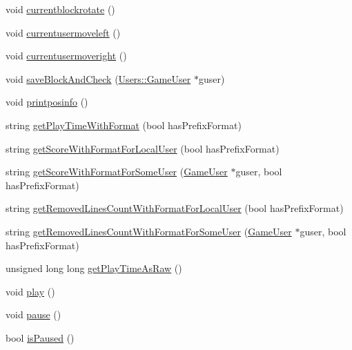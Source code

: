\begin{DoxyCompactItemize}
\item 
void \hyperlink{class_tetris_1_1_game_controller_a5d93facb945f87ba33fb8be74df023fa}{currentblockrotate} ()
\item 
void \hyperlink{class_tetris_1_1_game_controller_ac0d40a0936505754131099034b4271fa}{currentusermoveleft} ()
\item 
void \hyperlink{class_tetris_1_1_game_controller_a1d2859507cbc9bf9789753228cdedc1f}{currentusermoveright} ()
\item 
void \hyperlink{class_tetris_1_1_game_controller_a3c63a9754e4cbeae4f66a5760bb4055d}{save\+Block\+And\+Check} (\hyperlink{class_tetris_1_1_users_1_1_game_user}{Users\+::\+Game\+User} $\ast$guser)
\item 
void \hyperlink{class_tetris_1_1_game_controller_a269da7d33475ae2f327ee9a51f02ef52}{printposinfo} ()
\item 
string \hyperlink{class_tetris_1_1_game_controller_a71765a7d8b76400832c98002a113ed26}{get\+Play\+Time\+With\+Format} (bool has\+Prefix\+Format)
\item 
string \hyperlink{class_tetris_1_1_game_controller_a84270bd9c52aae8ba1434d96a96b6c3c}{get\+Score\+With\+Format\+For\+Local\+User} (bool has\+Prefix\+Format)
\item 
string \hyperlink{class_tetris_1_1_game_controller_ab9ee25a033698516dd98c254ab8f8f1b}{get\+Score\+With\+Format\+For\+Some\+User} (\hyperlink{class_tetris_1_1_users_1_1_game_user}{Game\+User} $\ast$guser, bool has\+Prefix\+Format)
\item 
string \hyperlink{class_tetris_1_1_game_controller_a9fdc5288a92d09283a6250d684d69876}{get\+Removed\+Lines\+Count\+With\+Format\+For\+Local\+User} (bool has\+Prefix\+Format)
\item 
string \hyperlink{class_tetris_1_1_game_controller_a2e7275bdb8f29ce4f1dfec790c22705d}{get\+Removed\+Lines\+Count\+With\+Format\+For\+Some\+User} (\hyperlink{class_tetris_1_1_users_1_1_game_user}{Game\+User} $\ast$guser, bool has\+Prefix\+Format)
\item 
unsigned long long \hyperlink{class_tetris_1_1_game_controller_afce7f1fc500acedd99636b837f9bccf4}{get\+Play\+Time\+As\+Raw} ()
\item 
void \hyperlink{class_tetris_1_1_game_controller_a766a7537d955c62969f2e4b7c0b3c73d}{play} ()
\item 
void \hyperlink{class_tetris_1_1_game_controller_a1f55b577248e34b4e0902ce114610edd}{pause} ()
\item 
bool \hyperlink{class_tetris_1_1_game_controller_a18e513f45750361e14af091704e9f1d4}{is\+Paused} ()

\end{DoxyCompactItemize}
